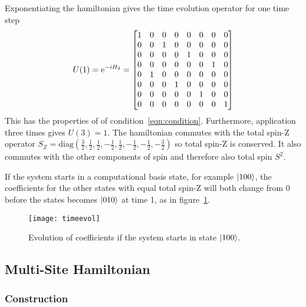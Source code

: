 
Exponentiating the hamiltonian gives the time evolution operator for one time step
\begin{align}
U(1) = \text{e}^{-iH_3} = \begin{bmatrix}
1 & 0 & 0 & 0 & 0 & 0 & 0 & 0 \\
0 & 0 & 1 & 0 & 0 & 0 & 0 & 0 \\
0 & 0 & 0 & 0 & 1 & 0 & 0 & 0 \\
0 & 0 & 0 & 0 & 0 & 0 & 1 & 0 \\
0 & 1 & 0 & 0 & 0 & 0 & 0 & 0 \\
0 & 0 & 0 & 1 & 0 & 0 & 0 & 0 \\
0 & 0 & 0 & 0 & 0 & 1 & 0 & 0 \\
0 & 0 & 0 & 0 & 0 & 0 & 0 & 1
\end{bmatrix}
\end{align}
This has the properties of of condition~\ref{eqn:condition}. Furthermore, application three times gives $U(3) = 1$. The hamiltonian commutes with the total spin-Z operator $S_Z = \text{diag}(\frac{3}{2}, \frac{1}{2}, \frac{1}{2}, -\frac{1}{2}, \frac{1}{2}, -\frac{1}{2}, -\frac{1}{2}, -\frac{3}{2})$ so total spin-Z is conserved. It also commutes with the other components of spin and therefore also total spin $S^2$.

If the system starts in a computational basis state, for example $\left|100\right\rangle$, the coefficients for the other states with equal total spin-Z will both change from 0 before the states becomes $\left|010\right\rangle$ at time 1, as in figure~\ref{fig:timeevol}.
\begin{figure}
	\centering
	\texttt{[image: timeevol]}
	\caption{Evolution of coefficients if the system starts in state $\left|100\right\rangle$.}
	\label{fig:timeevol}
\end{figure}

\subsection{Multi-Site Hamiltonian} \emph{}\label{sub:multistate}

\subsubsection{Construction} \label{subsub:construction} \emph{}

